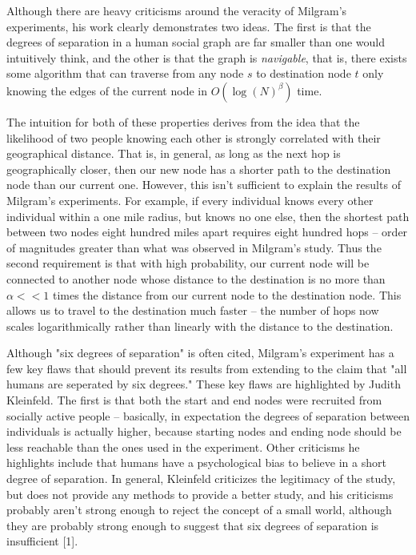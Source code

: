 \documentclass[prodmode,acmtecs]{acmsmall} %
\begin{document}
Although there are heavy criticisms around the veracity of Milgram's experiments, his work clearly demonstrates two ideas.
The first is that the degrees of separation in a human social graph are far smaller than one would intuitively think,
and the other is that the graph is \textit{navigable}, that is, there exists some algorithm that can traverse from any
node $s$ to destination node $t$ only knowing the edges of the current node in $O(\log(N)^\beta)$ time.

The intuition for both of these properties derives from the idea that the likelihood of two people knowing each other is strongly
correlated with their geographical distance. That is, in general, as long as the next hop is geographically closer, then our
new node has a shorter path to the destination node than our current one. However, this isn't sufficient to explain the
results of Milgram's experiments. For example, if every individual knows every other individual within a one mile radius, but
knows no one else, then the shortest path between two nodes eight hundred miles apart requires eight hundred hops -- order of 
magnitudes greater than what was observed in Milgram's study. Thus the second requirement is that with high probability, our current
node will be connected to another node whose distance to the destination is no more than $\alpha << 1$ times the distance from
our current node to the destination node. This allows us to travel to the destination much faster -- the number of hops now 
scales logarithmically rather than linearly with the distance to the destination. 

Although "six degrees of separation" is often cited, Milgram's experiment has a few key flaws that should prevent its results
from extending to the claim that "all humans are seperated by six degrees." These key flaws are highlighted by Judith Kleinfeld.
The first is that both the start and end nodes were recruited from socially active people -- 
basically, in expectation the degrees of separation between individuals is actually higher, because starting nodes and ending 
node should be less reachable than the ones used in the experiment. Other criticisms he highlights include that humans have
a psychological bias to believe in a short degree of separation. In general, Kleinfeld criticizes the legitimacy of the study, 
but does not provide any methods to provide a better study, and his criticisms probably aren't strong enough to reject the
concept of a small world, although they are probably strong enough to suggest that six degrees of separation is insufficient [1].
\end{document}
